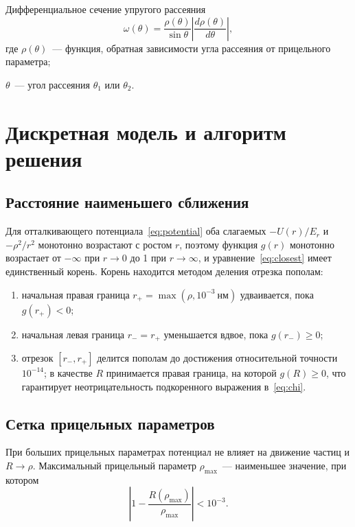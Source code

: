 \documentclass[a4paper,14pt]{extarticle}
\begin{document}
Дифференциальное сечение упругого рассеяния
\begin{equation}
  \omega(\theta) = \frac{\rho(\theta)}{\sin\theta}
  \left|\frac{d\rho(\theta)}{d\theta}\right|,
  \label{eq:sigma}
\end{equation}
где $\rho(\theta)$~--- функция, обратная зависимости угла рассеяния
от прицельного параметра;

$\theta$~--- угол рассеяния $\theta_1$ или $\theta_2$.

\section{Дискретная модель и алгоритм решения}

\subsection{Расстояние наименьшего сближения}

Для отталкивающего потенциала~\eqref{eq:potential} оба слагаемых
$-U(r)/E_r$ и $-\rho^2/r^2$ монотонно возрастают с ростом $r$, поэтому
функция $g(r)$ монотонно возрастает от $-\infty$ при $r \to 0$ до 1 при
$r \to \infty$, и уравнение~\eqref{eq:closest} имеет единственный корень.
Корень находится методом деления отрезка пополам:
\begin{enumerate}
  \item начальная правая граница $r_+ = \max(\rho, 10^{-3}~\text{нм})$
        удваивается, пока $g(r_+) < 0$;
  \item начальная левая граница $r_- = r_+$ уменьшается вдвое, пока
        $g(r_-) \geqslant 0$;
  \item отрезок $[r_-, r_+]$ делится пополам до достижения относительной
        точности $10^{-14}$; в качестве $R$ принимается правая граница,
        на которой $g(R) \geqslant 0$, что гарантирует неотрицательность
        подкоренного выражения в~\eqref{eq:chi}.
\end{enumerate}

\subsection{Сетка прицельных параметров}

При больших прицельных параметрах потенциал не влияет на движение частиц
и $R \to \rho$. Максимальный прицельный параметр $\rho_{\max}$~--- наименьшее
значение, при котором
\begin{equation}
  \left|1 - \frac{R(\rho_{\max})}{\rho_{\max}}\right| < 10^{-3}.
  \label{eq:rhomax}
\end{equation}
\end{document}
